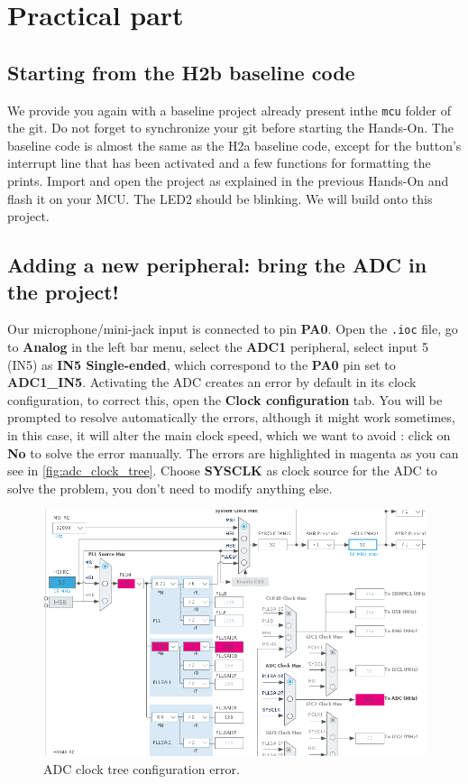 \clearpage
\section{Practical part}


\subsection{Starting from the H2b baseline code}
We provide you again with a baseline project already present inthe \texttt{mcu} folder of the git. Do not forget to synchronize your git before starting the Hands-On. The baseline code is almost the same as the H2a baseline code, except for the button's interrupt line that has been activated and a few functions for formatting the prints. Import and open the project as explained in the previous Hands-On and flash it on your MCU. The LED2 should be blinking. We will build onto this project.


\subsection{Adding a new peripheral: bring the ADC in the project!}
Our microphone/mini-jack input is connected to pin \textbf{PA0}. Open the \texttt{.ioc} file, go to \textbf{Analog} in the left bar menu, select the \textbf{ADC1} peripheral, select input 5 (IN5) as \textbf{IN5 Single-ended}, which correspond to the \textbf{PA0} pin set to \textbf{ADC1\_IN5}. Activating the ADC creates an error by default in its clock configuration, to correct this, open the \textbf{Clock configuration} tab. You will be prompted to resolve automatically the errors, although it might work sometimes, in this case, it will alter the main clock speed, which we want to avoid : click on \textbf{No} to solve the error manually. The errors are highlighted in magenta as you can see in \autoref{fig:adc_clock_tree}. Choose \textbf{SYSCLK} as clock source for the ADC to solve the problem, you don't need to modify anything else.

\begin{figure}[h]
    \centering
    \includegraphics[scale=0.4]{figures/adc_clock_tree.png}
    \caption{ADC clock tree configuration error. }
    \label{fig:adc_clock_tree}
\end{figure}

